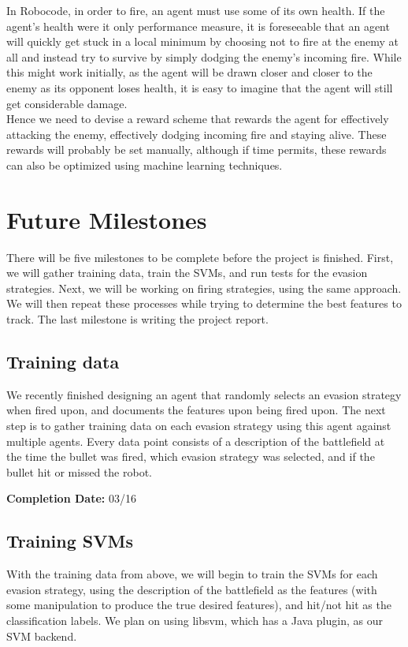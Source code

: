 \documentclass{article}
\theoremstyle{plain}
\theoremstyle{definition}
\theoremstyle{remark}
\begin{document}
In Robocode, in order to fire, an agent must use some of its own health. If the agent's health were it only performance measure, it is foreseeable that an agent will quickly get stuck in a local minimum by choosing not to fire at the enemy at all and instead try to survive by simply dodging the enemy's incoming fire. While this might work initially, as the agent will be drawn closer and closer to the enemy as its opponent loses health, it is easy to imagine that the agent will still get considerable damage.\\

Hence we need to devise a reward scheme that rewards the agent for effectively attacking the enemy, effectively dodging incoming fire and staying alive. These rewards will probably be set manually, although if time permits, these rewards can also be optimized using machine learning techniques.

\section{Future Milestones}
There will be five milestones to be complete before the project is finished. First, we will gather training data, train the SVMs, and run tests for the evasion strategies. Next, we will be working on firing strategies, using the same approach. We will then repeat these processes while trying to determine the best features to track. The last milestone is writing the project report.

\subsection*{Training data}
We recently finished designing an agent that randomly selects an evasion strategy when fired upon, and documents the features upon being fired upon. The next step is to gather training data on each evasion strategy using this agent against multiple agents. Every data point consists of a description of the battlefield at the time the bullet was fired, which evasion strategy was selected, and if the bullet hit or missed the robot.

{\bf Completion Date:}  03/16

\subsection*{Training SVMs}
With the training data from above, we will begin to train the SVMs for each evasion strategy, using the description of the battlefield as the features (with some manipulation to produce the true desired features), and hit/not hit as the classification labels. We plan on using libsvm, which has a Java plugin, as our SVM backend.
\end{document}
